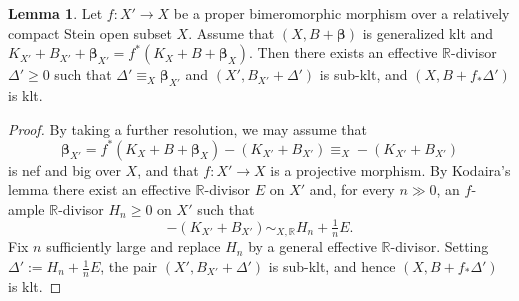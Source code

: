 \documentclass[11pt]{amsart}
\numberwithin{equation}{section}
\def\bbeta{\boldsymbol{\beta}}
\theoremstyle{definition}
\theoremstyle{definition}
\newtheorem{lemma}[theorem]{Lemma}
\theoremstyle{definition}
\begin{document}
\begin{lemma}
Let $f: X'\to X$ be a proper bimeromorphic morphism over a relatively compact Stein open subset $X$. Assume that $(X,B+\bbeta)$ is generalized klt and $K_{X'}+B_{X'}+\bbeta_{X'} = f^*(K_X+B+\bbeta_X)$. Then there exists an effective $\mathbb{R}$-divisor $\Delta'\geq 0$ such that $\Delta'\equiv_{X} \bbeta_{X'}$ and $(X',B_{X'}+\Delta')$ is sub-klt, and $(X,B+f_*\Delta')$ is klt.
\end{lemma}
\begin{proof}
By taking a further resolution, we may assume that
$$\bbeta_{X'} = f^*(K_X+B+\bbeta_X) - (K_{X'}+B_{X'}) \equiv_{X} -(K_{X'}+B_{X'})$$
is nef and big over $X$, and that $f: X'\to X$ is a projective morphism. By Kodaira's lemma there exist an effective $\mathbb{R}$-divisor $E$ on $X'$
and, for every $n\gg 0$, an $f$-ample $\mathbb{R}$-divisor $H_{n}\geq 0$ on
$X'$ such that
$$
  -(K_{X'}+B_{X'}) \sim_{X,\mathbb{R}} H_{n}+\tfrac{1}{n}E .
$$
Fix $n$ sufficiently large and replace $H_{n}$ by a general effective
$\mathbb{R}$-divisor. Setting
$\Delta' := H_{n}+\tfrac{1}{n}E$, the pair $(X',B_{X'}+\Delta')$ is sub-klt,
and hence $(X,B+f_{*}\Delta')$ is klt.
\end{proof}
\end{document}
